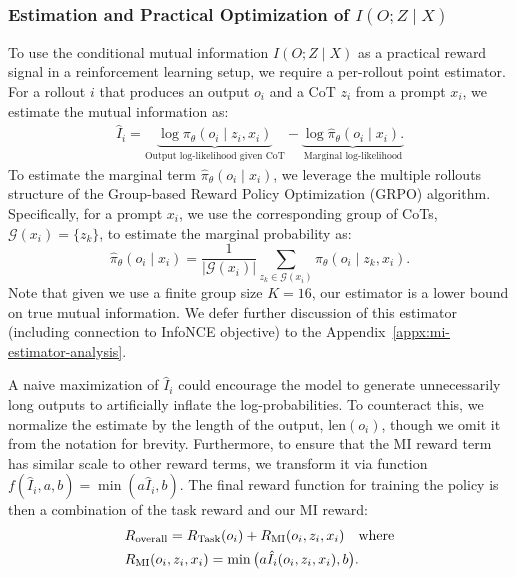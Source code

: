 \documentclass{article}
\theoremstyle{plain}
\newcommand{\TR}{R_{\mathrm{Task}}}
\newcommand{\MIR}{R_{\mathrm{MI}}}
\begin{document}
\subsubsection{Estimation and Practical Optimization of $I(O;Z \mid X)$}
\label{subsec:estimator}
To use the conditional mutual information $I(O;Z \mid X)$ as a practical reward signal in a reinforcement learning setup, we require a per-rollout point estimator. 
For a rollout $i$ that produces an output $o_i$ and a CoT $z_i$ from a prompt $x_i$, we estimate the mutual information as:
\begin{align}
\label{eq:mi_estimator}
\hat{I}_i = \underbrace{\log \pi_\theta(o_i \mid z_i, x_i)}_{\text{Output log-likelihood given CoT}} - \underbrace{\log \hat{\pi}_\theta(o_i \mid x_i).}_{\text{Marginal log-likelihood}}
\end{align}
To estimate the marginal term $\hat{\pi}_\theta(o_i \mid x_i)$, we leverage the multiple rollouts structure of the 
Group-based Reward Policy Optimization (GRPO) algorithm.
Specifically, for a prompt $x_i$, we use the corresponding group of CoTs, $\mathcal{G}(x_i) = \{z_k\}$, to estimate the marginal probability as:
\begin{equation}
\label{eq:marginal_estimator}
\hat{\pi}_\theta(o_i \mid x_i) = \frac{1}{|\mathcal{G}(x_i)|} \sum_{z_k \in \mathcal{G}(x_i)} \pi_\theta(o_i \mid z_k, x_i).
\end{equation}
Note that given we use a finite group size \(K=16\), our estimator is a lower bound on true mutual information.
We defer further discussion of this estimator (including connection to InfoNCE objective) to the Appendix~\ref{appx:mi-estimator-analysis}.

A naive maximization of $\hat{I}_i$ could encourage the model to generate unnecessarily long outputs to artificially inflate the log-probabilities.
To counteract this, we normalize the estimate by the length of the output, $\text{len}(o_i)$, though we omit it from the notation for brevity.
Furthermore, to ensure that the MI reward term has similar scale to other reward terms, we transform it via function \(f(\hat I_i, a, b) = \min(a\hat I_i, b)\). 
The final reward function for training the policy is then a combination of the task reward and our MI reward:
\begin{align}
\label{eq:final_reward}
&R_{\text{overall}} = \TR(o_i) + \MIR(o_i, z_i, x_i) \quad \text{where} \notag \\
&\MIR(o_i, z_i, x_i) = \min\big(a \hat I_i(o_i, z_i, x_i), b\big).
\end{align}
\end{document}
